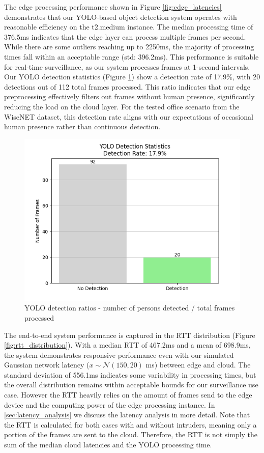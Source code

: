 \documentclass[conference]{IEEEtran}
\begin{document}
The edge processing performance shown in Figure \ref{fig:edge_latencies} demonstrates that our YOLO-based object detection system operates with reasonable efficiency on the t2.medium instance. The median processing time of 376.5ms indicates that the edge layer can process multiple frames per second. While there are some outliers reaching up to 2250ms, the majority of processing times fall within an acceptable range (std: 396.2ms). This performance is suitable for real-time surveillance, as our system processes frames at 1-second intervals.
Our YOLO detection statistics (Figure \ref{fig:yolo_ratios}) show a detection rate of 17.9\%, with 20 detections out of 112 total frames processed. This ratio indicates that our edge preprocessing effectively filters out frames without human presence, significantly reducing the load on the cloud layer. For the tested office scenario from the WiseNET dataset, this detection rate aligns with our expectations of occasional human presence rather than continuous detection.

\begin{figure}[h!]
    \centering
    \includegraphics[width=1\linewidth]{./res/evaluation_with_latencies/yolo_ratios.png}
    \caption{YOLO detection ratios - number of persons detected / total frames processed}
    \label{fig:yolo_ratios}
\end{figure}


The end-to-end system performance is captured in the RTT distribution (Figure \ref{fig:rtt_distribution}). With a median RTT of 467.2ms and a mean of 698.9ms, the system demonstrates responsive performance even with our simulated Gaussian network latency ($x \sim \mathcal{N}(150, 20)$ ms) between edge and cloud. The standard deviation of 556.1ms indicates some variability in processing times, but the overall distribution remains within acceptable bounds for our surveillance use case. However the RTT heavily relies on the amount of frames send to the edge device and the computing power of the edge processing instance. In \ref {sec:latency_analysis} we discuss the latency analysis in more detail. Note that the RTT is calculated for both cases with and without intruders, meaning only a portion of the frames are sent to the cloud. Therefore, the RTT is not simply the sum of the median cloud latencies and the YOLO processing time.
\end{document}
